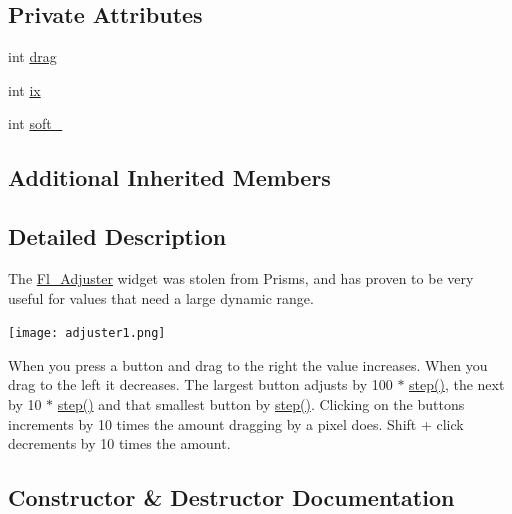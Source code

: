 \subsection*{Private Attributes}
\begin{DoxyCompactItemize}
\item 
int \hyperlink{class_fl___adjuster_aa070e4554dba946bde50685d4a3ad49d}{drag}
\item 
int \hyperlink{class_fl___adjuster_a6c120b2504570945b4683249af6ac748}{ix}
\item 
int \hyperlink{class_fl___adjuster_a42c38a6d83885056757bb08fcb211407}{soft\+\_\+}
\end{DoxyCompactItemize}
\subsection*{Additional Inherited Members}


\subsection{Detailed Description}
The \hyperlink{class_fl___adjuster}{Fl\+\_\+\+Adjuster} widget was stolen from Prisms, and has proven to be very useful for values that need a large dynamic range.  
\begin{DoxyImage}
\texttt{[image: adjuster1.png]}
\end{DoxyImage}
 

When you press a button and drag to the right the value increases. When you drag to the left it decreases. The largest button adjusts by 100 $\ast$ \hyperlink{class_fl___valuator_a3308133e6e4963e0e22f4fb405bef298}{step()}, the next by 10 $\ast$ \hyperlink{class_fl___valuator_a3308133e6e4963e0e22f4fb405bef298}{step()} and that smallest button by \hyperlink{class_fl___valuator_a3308133e6e4963e0e22f4fb405bef298}{step()}. Clicking on the buttons increments by 10 times the amount dragging by a pixel does. Shift + click decrements by 10 times the amount. 

\subsection{Constructor \& Destructor Documentation}
\mbox{\label{class_fl___adjuster_a723dfaffe10c1a3947113f8df736dd72}} 
